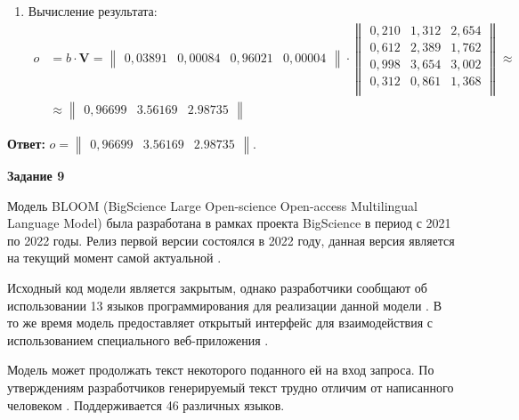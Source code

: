 \documentclass[12pt, a4paper]{extarticle}
\newenvironment*{dummyenv}{}{}
\newcommand{\mysection}[1]{
    \addcontentsline{toc}{section}{#1}
    \begin{dummyenv}
        \bfseries\large #1
    \end{dummyenv}
}
\newcommand{\Answer}[1]{\textbf{Ответ:} #1 \\}
\begin{document}
\begin{enumerate}
    \item Вычисление результата:
        \begin{equation}
        \begin{split}
            o & = b \cdot \mathbf{V} = 
                \begin{Vmatrix}
                    0,03891 & 0,00084 & 0,96021 & 0,00004
                \end{Vmatrix}
                \cdot
                \begin{Vmatrix}
                    0,210 & 1,312 & 2,654 \\
                    0,612 & 2,389 & 1,762 \\
                    0,998 & 3,654 & 3,002 \\
                    0,312 & 0,861 & 1,368 \\
                \end{Vmatrix} \approx \\
            & \approx
                \begin{Vmatrix}
                    0,96699 & 3.56169 & 2.98735
                \end{Vmatrix}
        \end{split}
        \end{equation}
\end{enumerate}

\Answer{$o = \begin{Vmatrix} 0,96699 & 3.56169 & 2.98735 \end{Vmatrix}$.}

\mysection{Задание 9}

Модель BLOOM (BigScience Large Open-science Open-access Multilingual Language Model) была разработана
в рамках проекта BigScience в период с 2021 по 2022 годы. Релиз первой версии состоялся в 2022 году,
данная версия является на текущий момент самой актуальной \cite{bib:bloom-hf}.

Исходный код модели является закрытым, однако разработчики сообщают об использовании 13 языков программирования
для реализации данной модели \cite{bib:what-to-tarin}. В то же время модель предоставляет открытый
интерфейс для взаимодействия с использованием специального веб-приложения \cite{bib:bloom-hf}.

Модель может продолжать текст некоторого поданного ей на вход запроса. По утверждениям разработчиков
генерируемый текст трудно отличим от написанного человеком \cite{bib:bloom-hf}. Поддерживается 46
различных языков.
\end{document}
